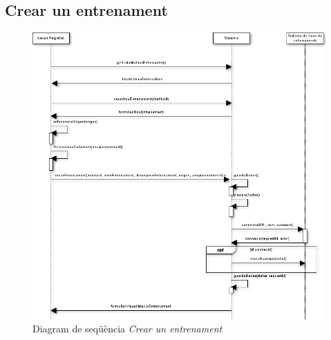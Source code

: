 \subsection*{Crear un entrenament}
\begin{figure}[H]
  \centering
  \includegraphics[scale=0.6]{img/specification/SequenceCreateTraining.png}
  \caption{Diagram de seqüència \textit{Crear un entrenament}}
  \label{fig:sequenceaddtraining}
\end{figure}

